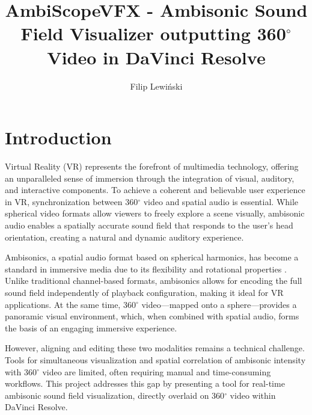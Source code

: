 \documentclass[convention,student-expo]{aesconf} %
\title{AmbiScopeVFX - Ambisonic Sound Field Visualizer outputting 360$^\circ$ Video in DaVinci Resolve}
\author[1]{Filip Lewiński}
\affil[1]{Gdańsk University of Technology, Faculty of Electronics, Telecommunications and Informatics}
\begin{document}

\section{Introduction}

Virtual Reality (VR) represents the forefront of multimedia technology, offering an unparalleled sense of immersion through the integration of visual, auditory, and interactive components. To achieve a coherent and believable user experience in VR, synchronization between 360$^\circ$ video and spatial audio is essential. While spherical video formats allow viewers to freely explore a scene visually, ambisonic audio enables a spatially accurate sound field that responds to the user's head orientation, creating a natural and dynamic auditory experience.

Ambisonics, a spatial audio format based on spherical harmonics, has become a standard in immersive media due to its flexibility and rotational properties \citep{zotter2019ambisonics}. Unlike traditional channel-based formats, ambisonics allows for encoding the full sound field independently of playback configuration, making it ideal for VR applications. At the same time, 360$^\circ$ video—mapped onto a sphere—provides a panoramic visual environment, which, when combined with spatial audio, forms the basis of an engaging immersive experience.

However, aligning and editing these two modalities remains a technical challenge. Tools for simultaneous visualization and spatial correlation of ambisonic intensity with 360$^\circ$ video are limited, often requiring manual and time-consuming workflows. This project addresses this gap by presenting a tool for real-time ambisonic sound field visualization, directly overlaid on 360$^\circ$ video within DaVinci Resolve.
\end{document}
